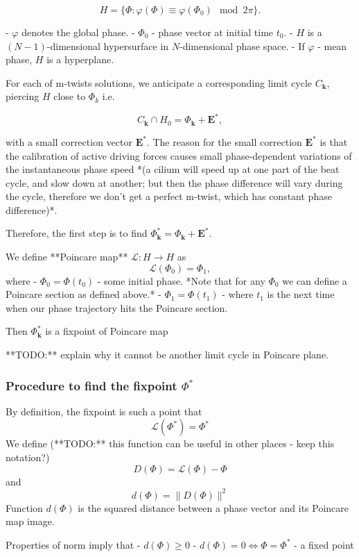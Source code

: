 \documentclass[a4paper,12pt]{article}
\begin{document}
$$
H =\{ \Phi : \varphi(\Phi) \equiv \varphi(\Phi_0) \mod 2\pi \}.
$$

- $\varphi$ denotes the global phase.
- $\Phi_0$ - phase vector at initial time $t_0$.
- $H$ is a $(N-1)$-dimensional hypersurface in $N$-dimensional phase space.
  - If $\varphi$ - mean phase, $H$ is a hyperplane.

For each of m-twists solutions, we anticipate a corresponding limit cycle $C_\mathbf{k}$, piercing $H$ close to $\Phi_k$ i.e.

$$
C_\mathbf{k} \cap H_0 = \Phi_\mathbf{k} + \mathbf{E}^*,
$$

with a small correction vector $\mathbf{E}^*$.
The reason for the small correction $\mathbf{E}^*$ is that the calibration of active driving forces causes small phase-dependent variations of the instantaneous phase speed *(a cilium will speed up at one part of the beat cycle, and slow down at another; but then the phase difference will vary during the cycle, therefore we don't get a perfect m-twist, which has constant phase difference)*.

Therefore, the first step is to find $\Phi^*_\mathbf{k}=\Phi_\mathbf{k} + \mathbf{E}^*$.

We define **Poincare map** $\mathcal{L}: H \rightarrow H$ as
 $$\mathcal{L}(\Phi_0) = \Phi_1,$$
where
- $\Phi_0 = \Phi(t_0)$ - some initial phase. *Note that for any $\Phi_0$ we can define a Poincare section as defined above.*
- $\Phi_1=\Phi(t_1)$ - where $t_1$ is the next time when our phase trajectory hits the Poincare section.

Then  $\Phi^*_\mathbf{k}$ is a fixpoint of Poincare map

**TODO:** explain why it cannot be another limit cycle in Poincare plane.

\subsubsection*{Procedure to find the fixpoint $\Phi^*$}

By definition, the fixpoint is such a point that
$$
\mathcal{L}(\Phi^*) = \Phi^*
$$
We define (**TODO:** this function can be useful in other places - keep this notation?)
$$
D(\Phi) = \mathcal{L}(\Phi) - \Phi
$$
and
$$
d(\Phi) = \lVert D(\Phi) \rVert ^ 2
$$
Function $d(\Phi)$ is the squared distance between a phase vector and its Poincare map image.

Properties of norm imply that
- $d(\Phi) \geq 0$
- $d(\Phi)=0 \iff \Phi = \Phi^*$ - a fixed point
\end{document}
